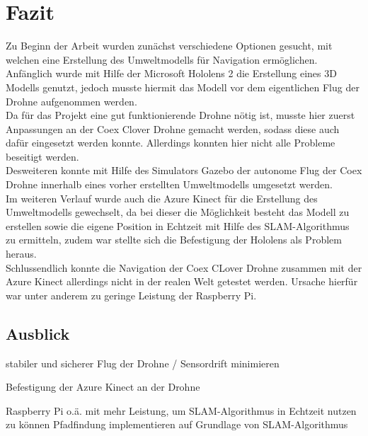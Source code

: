 \chapter{Fazit}
Zu Beginn der Arbeit wurden zunächst verschiedene Optionen gesucht, mit welchen eine Erstellung des Umweltmodells für Navigation ermöglichen. Anfänglich wurde mit Hilfe der Microsoft Hololens 2 die Erstellung eines 3D Modells genutzt, jedoch musste hiermit das Modell vor dem eigentlichen Flug der Drohne aufgenommen werden. \\
Da für das Projekt eine gut funktionierende Drohne nötig ist, musste hier zuerst Anpassungen an der Coex Clover Drohne gemacht werden, sodass diese auch dafür eingesetzt werden konnte. Allerdings konnten hier nicht alle Probleme beseitigt werden.\\ 
Desweiteren konnte mit Hilfe des Simulators Gazebo der autonome Flug der Coex Drohne innerhalb eines vorher erstellten Umweltmodells umgesetzt werden. \\
Im weiteren Verlauf wurde auch die Azure Kinect für die Erstellung des Umweltmodells gewechselt, da bei dieser die Möglichkeit besteht das Modell zu erstellen sowie die eigene Position in Echtzeit mit Hilfe des SLAM-Algorithmus zu ermitteln, zudem war stellte sich die Befestigung der Hololens als Problem heraus. \\ 
Schlussendlich konnte die Navigation der Coex CLover Drohne zusammen mit der Azure Kinect allerdings nicht in der realen Welt getestet werden. Ursache hierfür war unter anderem zu geringe Leistung der Raspberry Pi.




\section{Ausblick}
stabiler und sicherer Flug der Drohne / Sensordrift minimieren

Befestigung der Azure Kinect an der Drohne

Raspberry Pi o.ä. mit mehr Leistung, um SLAM-Algorithmus in Echtzeit nutzen zu können
Pfadfindung implementieren auf Grundlage von SLAM-Algorithmus 
